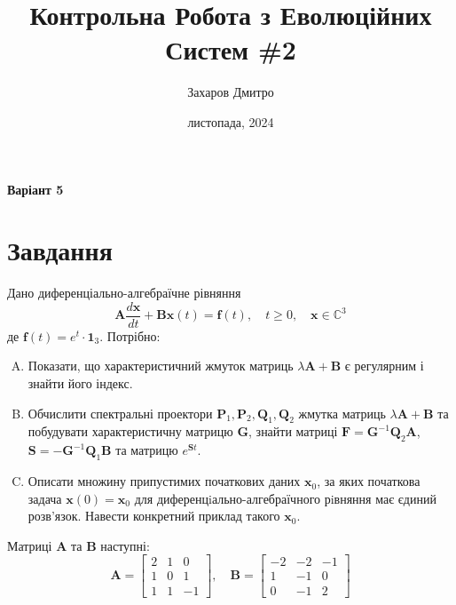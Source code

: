 \documentclass{hw_template}
\title{\huge\sffamily\bfseries Контрольна Робота з Еволюційних Систем \#2}
\author{\Large\sffamily Захаров Дмитро}
\date{\sffamily 15 листопада, 2024}
\begin{document}
\pagestyle{fancy}

\maketitle

\begin{center}
    \textbf{Варіант 5}
\end{center}

\tableofcontents

\pagebreak

\section{Завдання}

\begin{problem}
    Дано диференціально-алгебраїчне рівняння
    \begin{equation*}
        \boldsymbol{A}\frac{d\mathbf{x}}{dt} + \boldsymbol{B}\mathbf{x}(t) = \boldsymbol{f}(t), \quad t \geq 0, \quad \mathbf{x} \in \mathbb{C}^3
    \end{equation*}
    де $\boldsymbol{f}(t) = e^t \cdot \mathbf{1}_3$. Потрібно:
    \begin{enumerate}[(A)]
        \item Показати, що характеристичний жмуток матриць $\lambda\boldsymbol{A}+\boldsymbol{B}$ є регулярним і знайти його індекс.
        \item Обчислити спектральні проектори
        $\boldsymbol{P}_1,\boldsymbol{P}_2,\boldsymbol{Q}_1,\boldsymbol{Q}_2$
        жмутка матриць $\lambda\boldsymbol{A}+\boldsymbol{B}$ та побудувати
        характеристичну матрицю $\boldsymbol{G}$, знайти матриці $\boldsymbol{F}
        = \boldsymbol{G}^{-1}\boldsymbol{Q}_2\boldsymbol{A}$, $\boldsymbol{S} =
        -\boldsymbol{G}^{-1}\boldsymbol{Q}_1\boldsymbol{B}$ та матрицю $e^{\boldsymbol{S}t}$.
        \item Описати множину припустимих початкових даних $\mathbf{x}_0$, за
        яких початкова задача $\mathbf{x}(0) = \mathbf{x}_0$ для
        диференцiально-алгебраїчного рiвняння має єдиний розв’язок. Навести
        конкретний приклад такого $\mathbf{x}_0$.
    \end{enumerate}

    Матриці $\boldsymbol{A}$ та $\boldsymbol{B}$ наступні:
    \begin{equation*}
        \boldsymbol{A} = \begin{bmatrix}
            2 & 1 & 0 \\
            1 & 0 & 1 \\
            1 & 1 & -1
        \end{bmatrix}, \quad 
        \boldsymbol{B} = \begin{bmatrix}
            -2 & -2 & -1 \\
            1 & -1 & 0 \\
            0 & -1 & 2
        \end{bmatrix}
    \end{equation*}
\end{problem}
\end{document}
